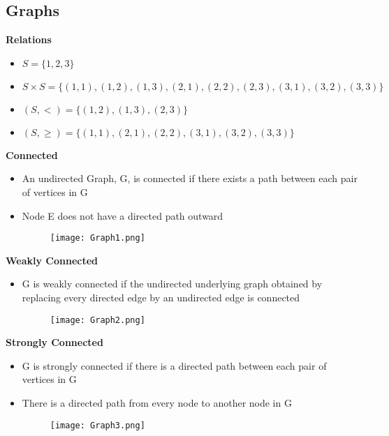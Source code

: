 \documentclass[10pt, 
a4paper, 
oneside, 
headinclude, footinclude, 
BCOR5mm]
{scrartcl}
\begin{document}
\subsection{Graphs}
\textbf{Relations}
\begin{itemize}
    \item $S = \{1, 2, 3\}$
    \item $S \times S = \{(1, 1), (1, 2), (1, 3), (2, 1), (2, 2), (2, 3), (3, 1), (3, 2), (3, 3)\}$
    \item $(S, <) = \{(1, 2), (1, 3), (2, 3)\}$
    \item $(S, \geq) = \{(1, 1), (2, 1), (2, 2), (3, 1), (3, 2), (3, 3)\}$
\end{itemize}
\textbf{Connected}
\begin{itemize}
    \item An undirected Graph, G, is connected if there exists a path between each pair of vertices in G
    \item Node E does not have a directed path outward
    \begin{figure}[H]
        \begin{center}
            \texttt{[image: Graph1.png]}
        \end{center}
    \end{figure}
\end{itemize}
\textbf{Weakly Connected}
\begin{itemize}
    \item G is weakly connected if the undirected underlying graph obtained by replacing every directed edge by
    an undirected edge is connected
    \begin{figure}[H]
        \begin{center}
            \texttt{[image: Graph2.png]}
        \end{center}
    \end{figure}
\end{itemize}
\textbf{Strongly Connected}
\begin{itemize}
    \item G is strongly connected if there is a directed path between each pair of vertices in G
    \item There is a directed path from every node to another node in G
    \begin{figure}[H]
        \begin{center}
            \texttt{[image: Graph3.png]}
        \end{center}
    \end{figure}
\end{itemize}
\end{document}
